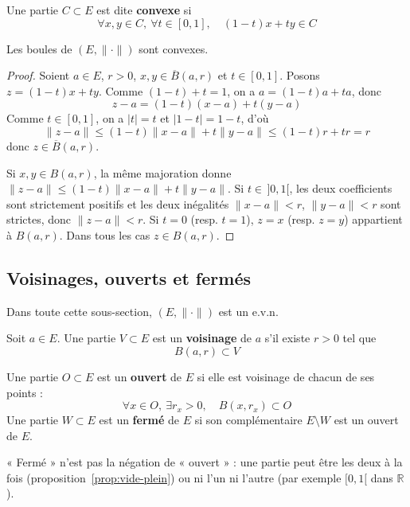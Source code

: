 \begin{defi}
\label{defi:convexe}
Une partie $C\subset E$ est dite \textbf{convexe} si
\[\forall x,y\in C,\ \forall t\in[0,1],\quad (1-t)x+ty \in C\]
\end{defi}

\begin{prop}
\label{prop:boule-convexe}
Les boules de $(E,\|\cdot\|)$ sont convexes.
\end{prop}

\begin{proof}
Soient $a\in E$, $r>0$, $x,y\in\overline{B}(a,r)$ et $t\in[0,1]$. Posons $z=(1-t)x+ty$. Comme $(1-t)+t=1$, on a $a=(1-t)a+ta$, donc
\[z-a = (1-t)(x-a)+t(y-a)\]
Comme $t\in[0,1]$, on a $|t|=t$ et $|1-t|=1-t$, d'où
\[\|z-a\| \leq (1-t)\|x-a\| + t\|y-a\| \leq (1-t)r+tr = r\]
donc $z\in\overline{B}(a,r)$.

Si $x,y\in B(a,r)$, la même majoration donne $\|z-a\|\leq(1-t)\|x-a\|+t\|y-a\|$. Si $t\in\,]0,1[$, les deux coefficients sont strictement positifs et les deux inégalités $\|x-a\|<r$, $\|y-a\|<r$ sont strictes, donc $\|z-a\|<r$. Si $t=0$ (resp. $t=1$), $z=x$ (resp. $z=y$) appartient à $B(a,r)$. Dans tous les cas $z\in B(a,r)$.
\end{proof}

\subsection{Voisinages, ouverts et fermés}

Dans toute cette sous-section, $(E,\|\cdot\|)$ est un e.v.n.

\begin{defi}[Voisinage]
\label{defi:voisinage}
Soit $a\in E$. Une partie $V\subset E$ est un \textbf{voisinage} de $a$ s'il existe $r>0$ tel que
\[B(a,r)\subset V\]
\end{defi}

\begin{defi}
\label{defi:ouvert}
Une partie $O\subset E$ est un \textbf{ouvert} de $E$ si elle est voisinage de chacun de ses points :
\[\forall x\in O,\ \exists r_x>0,\quad B(x,r_x)\subset O\]
Une partie $W\subset E$ est un \textbf{fermé} de $E$ si son complémentaire $E\setminus W$ est un ouvert de $E$.
\end{defi}

\begin{remarque}
« Fermé » n'est pas la négation de « ouvert » : une partie peut être les deux à la fois (proposition~\ref{prop:vide-plein}) ou ni l'un ni l'autre (par exemple $[0,1[$ dans $\mathbb{R}$).
\end{remarque}

